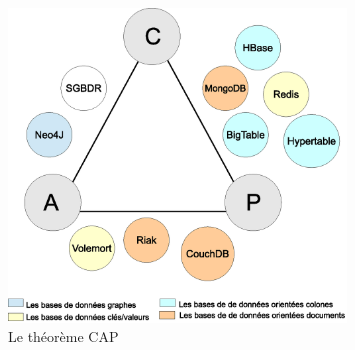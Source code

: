 \begin{figure}[h]
    \centering
    \includegraphics[width=0.8\textwidth]{figs/cap.eps}
    \caption{Le théorème CAP}
    \label{fig:cap}
\end{figure}

